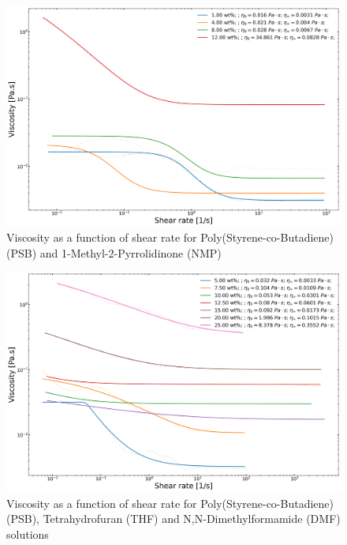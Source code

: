 \begin{figure}[!th]
\centering
\includegraphics[width=\textwidth]{./Figures/plt_PSBwtinNMP.png}
\decoRule
\caption[Viscosity as a function of shear rate for Poly(Styrene-co-Butadiene) (PSB) and 1-Methyl-2-Pyrrolidinone (NMP) solutions]{Viscosity as a function of shear rate for Poly(Styrene-co-Butadiene) (PSB) and 1-Methyl-2-Pyrrolidinone (NMP)}
\label{fig:plt_PSBwtinNMP}
\end{figure}

\begin{figure}[!th]
\centering
\includegraphics[width=\textwidth]{./Figures/plt_PSBwtinTHFandDMF.png}
\decoRule
\caption[Viscosity as a function of shear rate for Poly(Styrene-co-Butadiene) (PSB), Tetrahydrofuran (THF) and N,N-Dimethylformamide (DMF) solutions]{Viscosity as a function of shear rate for Poly(Styrene-co-Butadiene) (PSB), Tetrahydrofuran (THF) and N,N-Dimethylformamide (DMF) solutions}
\label{fig:plt_PSBwtinTHFandDMF}
\end{figure}

